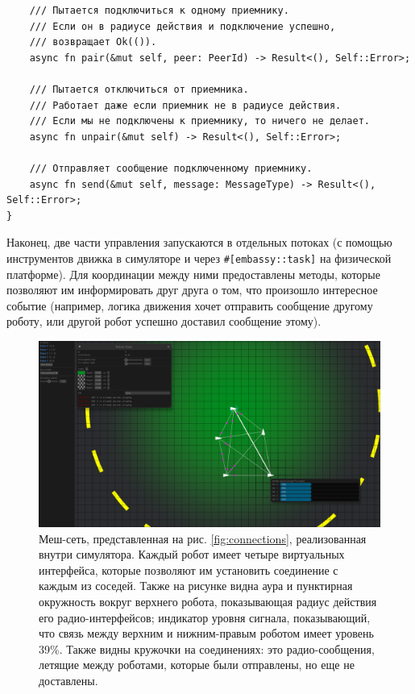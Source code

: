 \documentclass[%
]{report}
\begin{document}
\begin{listing}[h]
\begin{verbatim}
    /// Пытается подключиться к одному приемнику.
    /// Если он в радиусе действия и подключение успешно,
    /// возвращает Ok(()).
    async fn pair(&mut self, peer: PeerId) -> Result<(), Self::Error>;

    /// Пытается отключиться от приемника.
    /// Работает даже если приемник не в радиусе действия.
    /// Если мы не подключены к приемнику, то ничего не делает.
    async fn unpair(&mut self) -> Result<(), Self::Error>;

    /// Отправляет сообщение подключенному приемнику.
    async fn send(&mut self, message: MessageType) -> Result<(), Self::Error>;
}
\end{verbatim}
\end{listing}

Наконец, две части управления запускаются в отдельных потоках
(с помощью инструментов движка в симуляторе
и через \texttt{\#[embassy::task]} на физической платформе).
Для координации между ними предоставлены методы,
которые позволяют им информировать друг друга о том, что произошло интересное событие
(например, логика движения хочет
отправить сообщение другому роботу,
или другой робот успешно доставил сообщение этому).

\begin{figure}
  \centering
  \includegraphics[width=0.8\linewidth]{simulator-connections}
	\caption{Меш-сеть, представленная на рис. \ref{fig:connections}, реализованная внутри симулятора. Каждый робот имеет четыре виртуальных интерфейса, которые позволяют им установить соединение с каждым из соседей. Также на рисунке видна аура и пунктирная окружность вокруг верхнего робота, показывающая радиус действия его радио-интерфейсов; индикатор уровня сигнала, показывающий, что связь между верхним и нижним-правым роботом имеет уровень 39\%. Также видны кружочки на соединениях: это радио-сообщения, летящие между роботами, которые были отправлены, но еще не доставлены.}
  \label{fig:simulator-connections}
\end{figure}
\end{document}
